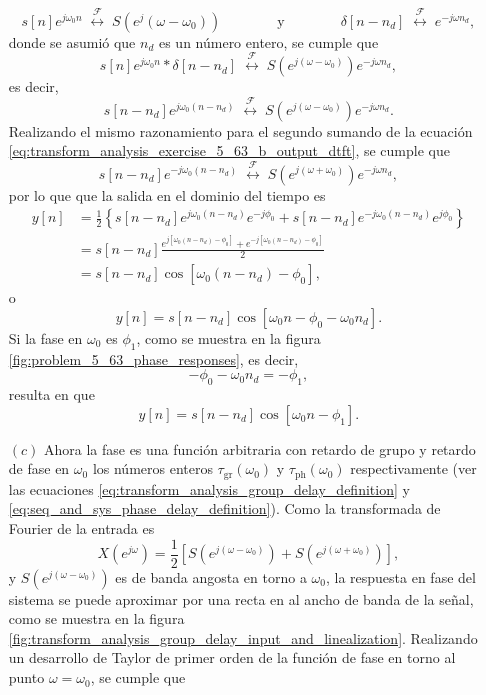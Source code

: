 \documentclass[a4paper]{report}
\begin{document}
\begin{enumerate}
\[
 s[n]e^{j\omega_0n}\;\overset{\mathcal{F}}{\longleftrightarrow}\;S(e^j(\omega-\omega_0))
 \qquad\qquad\textrm{y}\qquad\qquad
 \delta[n-n_d]\;\overset{\mathcal{F}}{\longleftrightarrow}\;e^{-j\omega n_d},
\]
donde se asumió que \(n_d\) es un número entero, se cumple que 
\[
 s[n]e^{j\omega_0n}*\delta[n-n_d]\;\overset{\mathcal{F}}{\longleftrightarrow}\;S(e^{j(\omega-\omega_0)})e^{-j\omega n_d},
\]
es decir,
\[
 s[n-n_d]e^{j\omega_0(n-n_d)}\;\overset{\mathcal{F}}{\longleftrightarrow}\;S(e^{j(\omega-\omega_0)})e^{-j\omega n_d}.
\]
Realizando el mismo razonamiento para el segundo sumando de la ecuación \ref{eq:transform_analysis_exercise_5_63_b_output_dtft}, se cumple que 
\[
 s[n-n_d]e^{-j\omega_0(n-n_d)}\;\overset{\mathcal{F}}{\longleftrightarrow}\;S(e^{j(\omega+\omega_0)})e^{-j\omega n_d},
\]
por lo que que la salida en el dominio del tiempo es 
\begin{align*}
 y[n]&=\frac{1}{2}\left\{s[n-n_d]e^{j\omega_0(n-n_d)}e^{-j\phi_0}+s[n-n_d]e^{-j\omega_0(n-n_d)}e^{j\phi_0}\right\}\\
  &=s[n-n_d]\frac{e^{j[\omega_0(n-n_d)-\phi_0]}+e^{-j[\omega_0(n-n_d)-\phi_0]}}{2}\\
  &=s[n-n_d]\cos[\omega_0(n-n_d)-\phi_0],
\end{align*}
o
\begin{equation}\label{eq:transform_analysis_exercise_5_63_b_output}
 y[n]=s[n-n_d]\cos[\omega_0n-\phi_0-\omega_0n_d]. 
\end{equation}
Si la fase en \(\omega_0\) es \(\phi_1\), como se muestra en la figura \ref{fig:problem_5_63_phase_responses}, es decir,
\[
 -\phi_0-\omega_0n_d=-\phi_1,
\]
resulta en que
\[
 y[n]=s[n-n_d]\cos[\omega_0n-\phi_1].
\]
 \item[\((c)\)] Ahora la fase es una función arbitraria con retardo de grupo y retardo de fase en \(\omega_0\) los números enteros \(\tau_\textrm{gr}(\omega_0)\) y \(\tau_\textrm{ph}(\omega_0)\) respectivamente (ver las ecuaciones \ref{eq:transform_analysis_group_delay_definition} y \ref{eq:seq_and_sys_phase_delay_definition}). Como la transformada de Fourier de la entrada es
 \[
  X(e^{j\omega})=\frac{1}{2}\left[S(e^{j(\omega-\omega_0)})+S(e^{j(\omega+\omega_0)})\right],
 \]
 y \(S(e^{j(\omega-\omega_0)})\) es de banda angosta en torno a \(\omega_0\), la respuesta en fase del sistema se puede aproximar por una recta en al ancho de banda de la señal, como se muestra en la figura \ref{fig:transform_analysis_group_delay_input_and_linealization}. Realizando un desarrollo de Taylor de primer orden de la función de fase en torno al punto \(\omega=\omega_0\), se cumple que

\end{enumerate}
\end{document}
